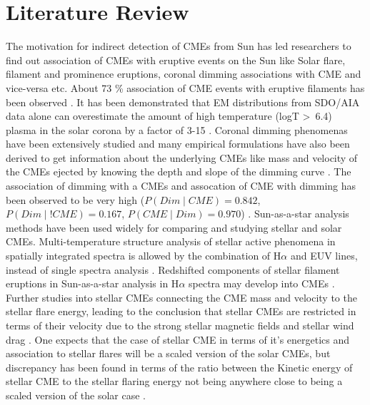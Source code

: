 \section{Literature Review}

The motivation for indirect detection of CMEs from Sun has led researchers to find out association of CMEs with eruptive events on the Sun like Solar flare, filament and prominence eruptions, coronal dimming associations with CME and vice-versa etc. About 73 \% association of CME events with eruptive filaments  has been observed \citep{Sinha2019}. It has been demonstrated that EM distributions from SDO/AIA data alone can overestimate the amount of high temperature (logT \textgreater\ 6.4) plasma in the solar corona by a factor of 3-15 \citep{Athiray2024}. Coronal dimming phenomenas have been extensively studied and many empirical formulations have also been derived to get information about the underlying CMEs like mass and velocity of the CMEs ejected by knowing the depth and slope of the dimming curve \citep{Mason2016}. The association of dimming with a CMEs and assocation of CME with dimming has been observed to be very high ($P(Dim \mid CME) = 0.842$, $P(Dim \mid !CME) = 0.167$, $P(CME \mid Dim) = 0.970$) \citep{Veronig2021-rf}. Sun-as-a-star analysis methods have been used widely for comparing and studying stellar and solar CMEs. Multi-temperature structure analysis of stellar active phenomena in spatially integrated spectra is allowed by the combination of H$\alpha$ and EUV lines, instead of single spectra analysis \citep{Otsu2024}. Redshifted components of stellar filament eruptions in Sun-as-a-star analysis in H$\alpha$ spectra may develop into CMEs \citep{Otsu2022}. Further studies into stellar CMEs connecting the CME mass and velocity to the stellar flare energy, leading to the conclusion that stellar CMEs are restricted in terms of their velocity due to the strong stellar magnetic fields and stellar wind drag \citep{Moschou2019-zq}. One expects that the case of stellar CME in terms of it's energetics and association to stellar flares will be a scaled version of the solar CMEs, but discrepancy has been found in terms of the ratio between the Kinetic energy of stellar CME to the stellar flaring energy not being anywhere close to being a scaled version of the solar case \citep{Namekata2022-dm}.

